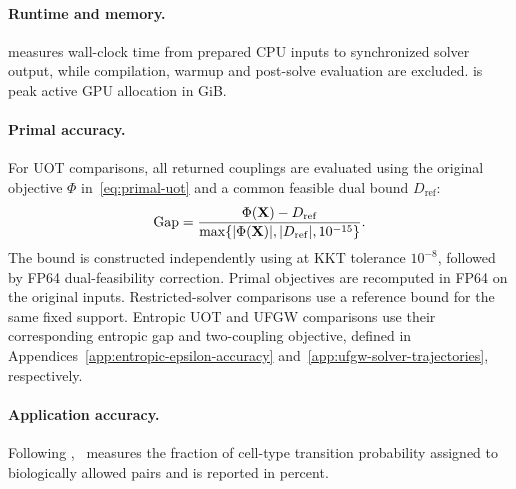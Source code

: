 \paragraph{Runtime and memory.}
\runtime measures wall-clock time from prepared CPU inputs to synchronized solver output, while compilation, warmup and post-solve evaluation are excluded.
\gpumemshort is peak active GPU allocation in GiB.

\paragraph{Primal accuracy.}
For UOT comparisons, all returned couplings are evaluated using the original objective $\Phi$ in~\eqref{eq:primal-uot} and a common feasible dual bound $D_{\mathrm{ref}}$:
\begin{equation}
\mathrm{Gap}=\frac{\Phi(\mathbf X)-D_{\mathrm{ref}}}{\max\{|\Phi(\mathbf X)|,|D_{\mathrm{ref}}|,10^{-15}\}}.
\label{eq:experimental-shared-gap}
\end{equation}
The bound is constructed independently using \ours at KKT tolerance $10^{-8}$, followed by FP64 dual-feasibility correction.
Primal objectives are recomputed in FP64 on the original inputs.
Restricted-solver comparisons use a reference bound for the same fixed support.
Entropic UOT and UFGW comparisons use their corresponding entropic gap and two-coupling objective, defined in Appendices~\ref{app:entropic-epsilon-accuracy} and~\ref{app:ufgw-solver-trajectories}, respectively.

\paragraph{Application accuracy.}
Following \citet{klein2025mapping}, \transitionacc\ measures the fraction of cell-type transition probability assigned to biologically allowed pairs and is reported in percent.



